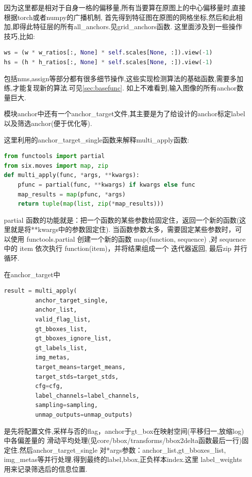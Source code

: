 \documentclass[UTF8]{ctexart}
\begin{document}
因为这里都是相对于自身一格的偏移量,所有当要算在原图上的中心偏移量时,直接根据torch或者numpy的广播机制,
首先得到特征图在原图的网格坐标,然后和此相加,即得此特征层的所有all\_anchors.见grid\_anchors函数.
这里面涉及到一些操作技巧,比如:
\lstset{style=mystyle}
\begin{lstlisting}[language=Python]
ws = (w * w_ratios[:, None] * self.scales[None, :]).view(-1)
hs = (h * h_ratios[:, None] * self.scales[None, :]).view(-1)
\end{lstlisting}
包括nms,assign等部分都有很多细节操作,这些实现检测算法的基础函数,需要多加练,才能复现新的算法.可见\ref{sec:basefunc}.
如上不难看到,输入图像的所有anchor数量巨大.


模块anchor中还有一个anchor\_target文件,其主要是为了给设计的anchor标定label以及筛选anchor(便于优化等).

这里利用的anchor\_target\_single函数来解释multi\_apply函数:
\lstset{style=mystyle}
\begin{lstlisting}[language=Python]
from functools import partial
from six.moves import map, zip
def multi_apply(func, *args, **kwargs):
    pfunc = partial(func, **kwargs) if kwargs else func
    map_results = map(pfunc, *args)
	return tuple(map(list, zip(*map_results)))
\end{lstlisting}

partial 函数的功能就是：把一个函数的某些参数给固定住，返回一个新的函数(这里就是将**kwargs中的参数固定住).
当函数参数太多，需要固定某些参数时，可以使用 functools.partial 创建一个新的函数
map(function, sequence) ,对 sequence 中的 item 依次执行 function(item)，并将结果组成一个 迭代器返回,
最后zip 并行循环.

在anchor\_target中
\lstset{style=mystyle}
\begin{lstlisting}[language=Python]
result = multi_apply(
         anchor_target_single,
         anchor_list,
         valid_flag_list,
         gt_bboxes_list,
         gt_bboxes_ignore_list,
         gt_labels_list,
         img_metas,
         target_means=target_means,
         target_stds=target_stds,
         cfg=cfg,
         label_channels=label_channels,
         sampling=sampling,
		 unmap_outputs=unmap_outputs)
\end{lstlisting}

是先将配置文件,采样与否的flag，anchor于gt\_box在映射空间(平移归一,放缩log)中各偏差量的
滑动平均处理(见core/bbox/transforms/bbox2delta函数最后一行)固定住.然后anchor\_target\_single
对*args参数：anchor\_list,gt\_bboxes\_list, img\_metas等并行处理.得到最终的label,bbox,正负样本index.这里 label\_weights用来记录筛选后的信息位置.
\end{document}
